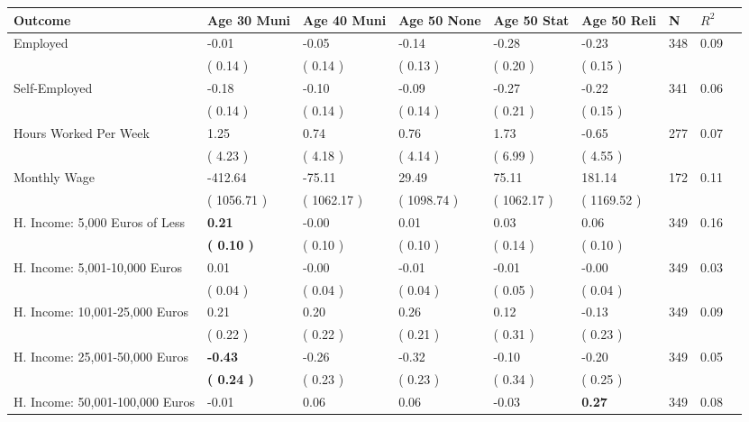 \begin{tabular}{L{6.2cm} C{1.8cm} C{1.8cm} C{1.8cm} C{1.8cm} C{1.8cm} C{1.8cm} C{0.3cm} C{0.3cm}}
\toprule
 \textbf{Outcome} & \textbf{Age 30 Muni} & \textbf{Age 40 Muni} & \textbf{Age 50 None} & \textbf{Age 50 Stat} & \textbf{Age 50 Reli} & \textbf{N} & \textbf{$ R^2$} \\
\midrule
Employed &     -0.01 &     -0.05 &     -0.14 &     -0.28 &     -0.23  & 348 &       0.09 \\ 
 & (     0.14 ) & (     0.14 ) & (     0.13 ) & (     0.20 ) & (     0.15 )  & \\
Self-Employed &     -0.18 &     -0.10 &     -0.09 &     -0.27 &     -0.22  & 341 &       0.06 \\ 
 & (     0.14 ) & (     0.14 ) & (     0.14 ) & (     0.21 ) & (     0.15 )  & \\
Hours Worked Per Week &      1.25 &      0.74 &      0.76 &      1.73 &     -0.65  & 277 &       0.07 \\ 
 & (     4.23 ) & (     4.18 ) & (     4.14 ) & (     6.99 ) & (     4.55 )  & \\
Monthly Wage &   -412.64 &    -75.11 &     29.49 &     75.11 &    181.14  & 172 &       0.11 \\ 
 & (  1056.71 ) & (  1062.17 ) & (  1098.74 ) & (  1062.17 ) & (  1169.52 )  & \\
H. Income: 5,000 Euros of Less & \textbf{     0.21} &     -0.00 &      0.01 &      0.03 &      0.06  & 349 &       0.16 \\ 
 & \textbf{(     0.10 )} & (     0.10 ) & (     0.10 ) & (     0.14 ) & (     0.10 )  & \\
H. Income: 5,001-10,000 Euros &      0.01 &     -0.00 &     -0.01 &     -0.01 &     -0.00  & 349 &       0.03 \\ 
 & (     0.04 ) & (     0.04 ) & (     0.04 ) & (     0.05 ) & (     0.04 )  & \\
H. Income: 10,001-25,000 Euros &      0.21 &      0.20 &      0.26 &      0.12 &     -0.13  & 349 &       0.09 \\ 
 & (     0.22 ) & (     0.22 ) & (     0.21 ) & (     0.31 ) & (     0.23 )  & \\
H. Income: 25,001-50,000 Euros & \textbf{    -0.43} &     -0.26 &     -0.32 &     -0.10 &     -0.20  & 349 &       0.05 \\ 
 & \textbf{(     0.24 )} & (     0.23 ) & (     0.23 ) & (     0.34 ) & (     0.25 )  & \\
H. Income: 50,001-100,000 Euros &     -0.01 &      0.06 &      0.06 &     -0.03 & \textbf{     0.27}  & 349 &       0.08 \\ 

\end{tabular}
